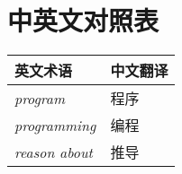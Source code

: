 \chapter*{中英文对照表}

\begin{table}[htbp]
\label{tab:threesome}
\centering
\begin{tabular}{ll}
\hline
英文术语 & 中文翻译 \\
\hline
\textit{program} & 程序 \\
\textit{programming} & 编程\\
\textit{reason about} & 推导 \\
\hline
\end{tabular}
\end{table}

